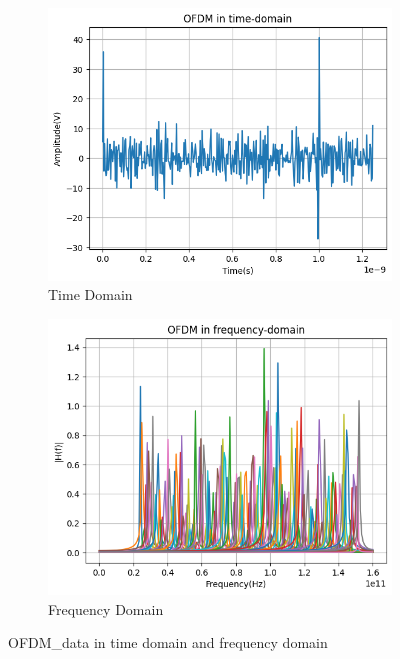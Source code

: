 \begin{figure}[htbp]
    \centering
    \begin{subfigure}[t]{.49\linewidth}
        \includegraphics[width=\linewidth]{../Source/results/time_domain_1}
        \caption{Time Domain}
        \label{time-domain}
    \end{subfigure}
    \hfil
    \begin{subfigure}[t]{0.49\linewidth}
        \includegraphics[width=\linewidth]{../Source/results/freq_domain_1}
        \caption{Frequency Domain}
        \label{freq-domain}
    \end{subfigure}
    \caption{OFDM\_data in time domain and frequency domain}
    \label{time-freq}
\end{figure}


